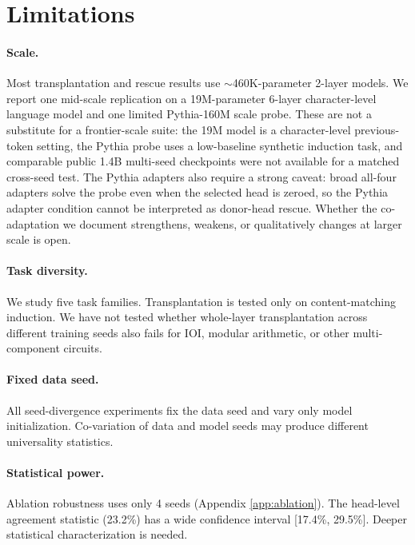 \documentclass[final]{article}
\begin{document}
\section{Limitations}
\label{sec:limits}

\paragraph{Scale.} Most transplantation and rescue results use
$\sim$460K-parameter 2-layer models. We report one mid-scale replication on a
19M-parameter 6-layer character-level language model and one limited
Pythia-160M scale probe. These are not a substitute for a frontier-scale
suite: the 19M model is a character-level previous-token setting, the Pythia
probe uses a low-baseline synthetic induction task, and comparable public 1.4B
multi-seed checkpoints were not available for a matched cross-seed test. The
Pythia adapters also require a strong caveat: broad
all-four adapters solve the probe even when the selected head is zeroed, so the
Pythia adapter condition cannot be interpreted as donor-head rescue. Whether
the co-adaptation we document strengthens, weakens, or qualitatively changes at
larger scale is open.

\paragraph{Task diversity.} We study five task families. Transplantation is
tested only on content-matching induction. We have not tested whether whole-layer
transplantation across different training seeds also fails for IOI, modular
arithmetic, or other multi-component circuits.

\paragraph{Fixed data seed.} All seed-divergence experiments fix the data seed
and vary only model initialization. Co-variation of data and model seeds may
produce different universality statistics.

\paragraph{Statistical power.} Ablation robustness uses only 4 seeds (Appendix
\ref{app:ablation}). The head-level agreement statistic (23.2\%) has a wide
confidence interval [17.4\%, 29.5\%]. Deeper statistical characterization is
needed.
\end{document}
